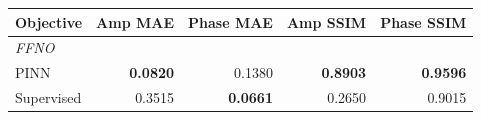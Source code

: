 \begin{tabular}{lrrrr}
\toprule
Objective & Amp MAE & Phase MAE & Amp SSIM & Phase SSIM \\
\midrule
\multicolumn{5}{l}{\textit{FFNO}} \\
\midrule
PINN & \textbf{0.0820} & 0.1380 & \textbf{0.8903} & \textbf{0.9596} \\
Supervised & 0.3515 & \textbf{0.0661} & 0.2650 & 0.9015 \\
\bottomrule
\end{tabular}
